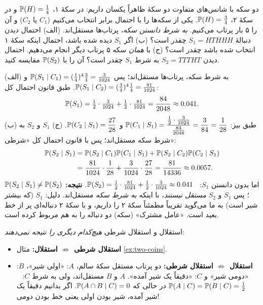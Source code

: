 \begin{example}[label=ex:two-coins]{دو سکه با شانس‌های متفاوت}
دو سکهٔ ظاهراً یکسان داریم: در سکهٔ ۱، $\P(H)=\tfrac14$ و در سکهٔ ۲، $\P(H)=\tfrac34$. یکی از سکه‌ها را با احتمال برابر انتخاب می‌کنیم ($C_1$ یا $C_2$) و آن را ۵ بار پرتاب می‌کنیم. \emph{به شرط دانستن سکه}، پرتاب‌ها مستقل‌اند.
(الف) احتمال دیدن دنبالهٔ $S_1=HTHHH$ چقدر است؟
(ب) اگر $S_1$ دیده شده باشد، احتمال اینکه سکهٔ ۱ انتخاب شده باشد چقدر است؟
(ج) با \emph{همان} سکه ۵ پرتاب دیگر انجام می‌دهیم. احتمال دیدن $S_2=TTTHT$ به شرط $S_1$ چقدر است؟ آن را با $\P(S_2)$ مقایسه کنید.
\begin{solution}
(الف) به شرط سکه، پرتاب‌ها مستقل‌اند؛ پس $\P(S_1\mid C_1)=(\tfrac14)^4\tfrac34=\tfrac{3}{1024}$ و $\P(S_1\mid C_2)=(\tfrac34)^4\tfrac14=\tfrac{81}{1024}$. طبق قانون احتمال کل:
\[ \P(S_1)=\tfrac12\cdot\tfrac{3}{1024}+\tfrac12\cdot\tfrac{81}{1024}=\frac{84}{2048}\approx0.041. \]
(ب) طبق بیز: \quad $\P(C_1\mid S_1)=\dfrac{\tfrac12\cdot\tfrac{3}{1024}}{\tfrac{84}{2048}}=\dfrac{3}{84}=\dfrac1{28}$ \quad و \quad $\P(C_2\mid S_1)=\dfrac{27}{28}$.
(ج) $S_1$ و $S_2$ به شرط سکه مستقل‌اند؛ پس با قانون احتمال کل «شرطی»:
\begin{align*}
\P(S_2\mid S_1)&=\P(S_2\mid C_1)\P(C_1\mid S_1)+\P(S_2\mid C_2)\P(C_2\mid S_1)\\
&=\frac{81}{1024}\cdot\frac1{28}+\frac{3}{1024}\cdot\frac{27}{28}=\frac{81}{14336}\approx0.0057.
\end{align*}
اما بدون دانستن $S_1$: \ $\P(S_2)=\tfrac12\cdot\tfrac{81}{1024}+\tfrac12\cdot\tfrac{3}{1024}\approx0.041$.
\textbf{نتیجه:} $\P(S_2\mid S_1)\ne\P(S_2)$؛ پس $S_1$ و $S_2$ \emph{مستقل نیستند}، با اینکه \emph{به شرط سکه} مستقل‌اند. دلیل: $S_1$ (که بیشتر شیر است) به ما می‌گوید تقریباً مطمئناً سکهٔ ۲ را داریم، و با سکهٔ ۲ دنباله‌ای پر از خط بعید است. «عامل مشترک» (سکه) دو دنباله را به هم مربوط کرده است.
\end{solution}
\end{example}

\begin{warning}
استقلال و استقلال شرطی \emph{هیچ‌کدام دیگری را نتیجه نمی‌دهند}:
\begin{itemize}
  \item \textbf{استقلال شرطی $\not\Rightarrow$ استقلال:} مثال \ref{ex:two-coins}.
  \item \textbf{استقلال $\not\Rightarrow$ استقلال شرطی:} دو پرتاب مستقل سکهٔ سالم، $A$: «اولی شیر»، $B$: «دومی شیر» و $C$: «دقیقاً یک شیر آمده». $A$ و $B$ مستقل‌اند، ولی به شرط $C$: \ $\P(A\mid C)=\P(B\mid C)=\tfrac12$ در حالی که $\P(A\cap B\mid C)=0$. اگر بدانیم دقیقاً یک شیر آمده، شیر بودن اولی یعنی خط بودن دومی!
\end{itemize}
\end{warning}

